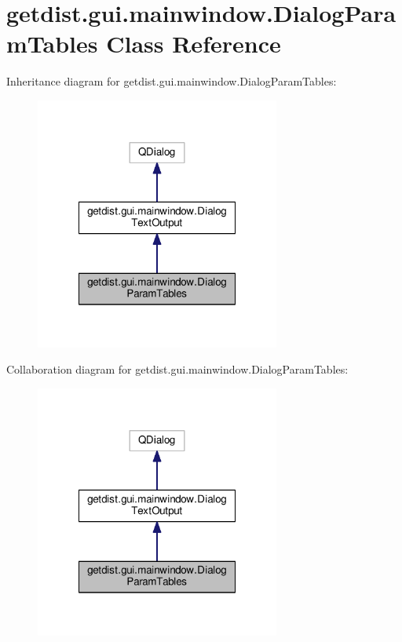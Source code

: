 \hypertarget{classgetdist_1_1gui_1_1mainwindow_1_1DialogParamTables}{}\section{getdist.\+gui.\+mainwindow.\+Dialog\+Param\+Tables Class Reference}
\label{classgetdist_1_1gui_1_1mainwindow_1_1DialogParamTables}


Inheritance diagram for getdist.\+gui.\+mainwindow.\+Dialog\+Param\+Tables\+:
\nopagebreak
\begin{figure}[H]
\begin{center}
\leavevmode
\includegraphics[width=228pt]{classgetdist_1_1gui_1_1mainwindow_1_1DialogParamTables__inherit__graph}
\end{center}
\end{figure}


Collaboration diagram for getdist.\+gui.\+mainwindow.\+Dialog\+Param\+Tables\+:
\nopagebreak
\begin{figure}[H]
\begin{center}
\leavevmode
\includegraphics[width=228pt]{classgetdist_1_1gui_1_1mainwindow_1_1DialogParamTables__coll__graph}
\end{center}
\end{figure}
